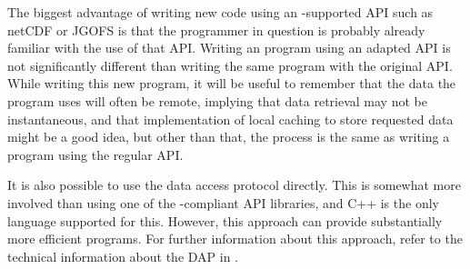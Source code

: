 The biggest advantage of writing new code using an \opendap-supported API
such as netCDF or JGOFS is that the programmer in question is probably
already familiar with the use of that API. Writing an \opendap program using
an adapted API is not significantly different than writing the same
program with the original API. While writing this new program, it will be
useful to remember that the data the program uses will often be remote,
implying that data retrieval may not be instantaneous, and that
implementation of local caching to store requested data might be a good
idea, but other than that, the process is the same as writing a program
using the regular API.
  

It is also possible to use the \opendap data access protocol directly.
This is somewhat more involved than using one of the \opendap-compliant
API libraries, and C++ is the only language supported for this.
However, this approach can provide substantially more efficient
programs. For further information about this approach, refer to the
technical information about the DAP in \OPDapi .

%
%
%
%
%


